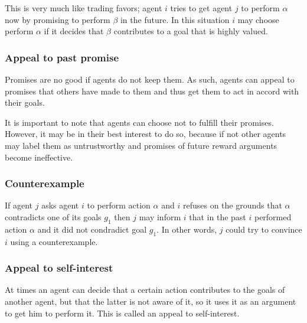 \documentclass{article}
\begin{document}
This is very much like trading favors; agent $i$ tries to get agent $j$ to perform $\alpha$ now by promising to perform $\beta$ in the future. In this situation $i$ may choose perform $\alpha$ if it decides that $\beta$ contributes to a goal that is highly valued.

\subsubsection{Appeal to past promise}
Promises are no good if agents do not keep them. As such, agents can appeal to promises that others have made to them and thus get them to act in accord with their goals.

It is important to note that agents can choose not to fulfill their promises. However, it may be in their best interest to do so, because if not other agents may label them as untrustworthy and promises of future reward arguments become ineffective.

\subsubsection{Counterexample}
If agent $j$ asks agent $i$ to perform action $\alpha$ and $i$ refuses on the grounds that $\alpha$ contradicts one of its goals $g_1$ then $j$ may inform $i$ that in the past $i$  performed action $\alpha$ and it did not condradict goal $g_1$. In other words, $j$ could try to convince $i$ using a counterexample.

\subsubsection{Appeal to self-interest}
At times an agent can decide that a certain action contributes to the goals of another agent, but that the latter is not aware of it, so it uses it as an argument to get him to perform it. This is called an appeal to self-interest.
\end{document}
